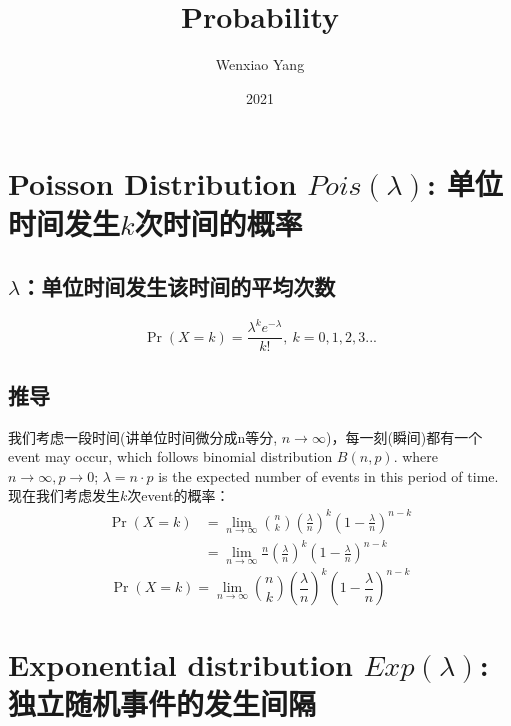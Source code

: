 \documentclass[11pt,a4paper]{article}
\title{Probability}
\author[*]{Wenxiao Yang}
\affil[*]{Department of Mathematics, University of Illinois at Urbana-Champaign}
\date{2021}
\begin{document}
\maketitle
\tableofcontents
\newpage


\section{Poisson Distribution $Pois(\lambda)$: 单位时间发生$k$次时间的概率}
\subsection{$\lambda$：单位时间发生该时间的平均次数}
$$\Pr(X{=}k)= \frac{\lambda^k e^{-\lambda}}{k!},\ k=0,1,2,3...$$
\subsection{推导}
我们考虑一段时间(讲单位时间微分成n等分, $n \rightarrow \infty$)，每一刻(瞬间)都有一个event may occur, which follows binomial distribution $B(n,p)$. where $n \rightarrow \infty, p \rightarrow 0$; $\lambda=n\cdot p$ is the expected number of events in this period of time.\\
现在我们考虑发生$k$次event的概率：
\begin{equation}
    \begin{aligned}
        \Pr(X=k)&=\lim_{n \rightarrow\infty} \binom{n}{k} (\frac{\lambda}{n})^k(1-\frac{\lambda}{n})^{n-k}\\
        &=\lim_{n \rightarrow\infty} \frac{n}{} (\frac{\lambda}{n})^k(1-\frac{\lambda}{n})^{n-k}
    \end{aligned}
    \nonumber
\end{equation}
$$\Pr(X=k)=\lim_{n \rightarrow\infty} \binom{n}{k} (\frac{\lambda}{n})^k(1-\frac{\lambda}{n})^{n-k}$$































\section{Exponential distribution $Exp(\lambda)$: 独立随机事件的发生间隔}
\end{document}
